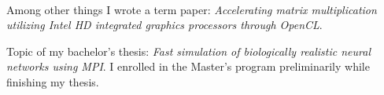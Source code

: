 


 \\

\medskip
Among other things I wrote a term paper: \emph{Accelerating matrix multiplication utilizing Intel HD integrated graphics processors through OpenCL}.

\divider


Topic of my bachelor's thesis: \emph{Fast simulation of biologically realistic neural networks using MPI}. I enrolled in the Master's program preliminarily while finishing my thesis.

